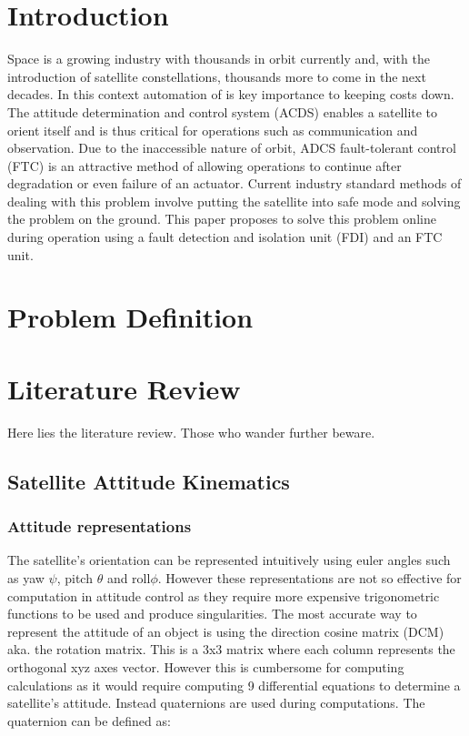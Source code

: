 \section{Introduction}

Space is a growing industry with thousands in orbit currently and, with the introduction of satellite constellations, thousands more to come in the next decades. In this context automation of is key importance to keeping costs down. The attitude determination and control system (ACDS) enables a satellite to orient itself and is thus critical for operations such as communication and observation. Due to the inaccessible nature of orbit, ADCS fault-tolerant control (FTC) is an attractive method of allowing operations to continue after degradation or even failure of an actuator. Current industry standard methods of dealing with this problem involve putting the satellite into safe mode and solving the problem on the ground. This paper proposes to solve this problem online during operation using a fault detection and isolation unit (FDI) and an FTC unit.

\section{Problem Definition}

\section{Literature Review}

Here lies the literature review. Those who wander further beware.

\subsection{Satellite Attitude Kinematics}

\subsubsection{Attitude representations}
The satellite's orientation can be represented intuitively using euler angles such as yaw $\psi$, pitch $\theta$ and roll$\phi$. However these representations are not so effective for computation in attitude control as they require more expensive trigonometric functions to be used and produce singularities. The most accurate way to represent the attitude of an object is using the direction cosine matrix (DCM) aka. the rotation matrix. This is a 3x3 matrix where each column represents the orthogonal xyz axes vector. However this is cumbersome for computing calculations as it would require computing 9 differential equations to determine a satellite's attitude. Instead quaternions are used during computations. The quaternion can be defined as: 

